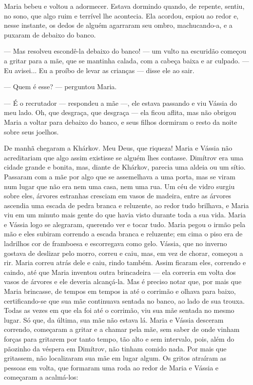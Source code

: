 Maria bebeu e voltou a adormecer. Estava dormindo quando, de repente,
sentiu, no sono, que algo ruim e terrível lhe acontecia. Ela acordou,
espiou ao redor e, nesse instante, os dedos de alguém agarraram seu
ombro, machucando-a, e a puxaram de debaixo do banco.

--- Mas resolveu escondê-la debaixo do banco! --- um vulto na escuridão
começou a gritar para a mãe, que se mantinha calada, com a cabeça baixa
e ar culpado. --- Eu avisei... Eu a proíbo de levar as crianças ---
disse ele ao sair.

--- Quem é esse? --- perguntou Maria.

--- É o recrutador --- respondeu a mãe ---, ele estava passando e viu
Vássia do meu lado. Oh, que desgraça, que desgraça --- ela ficou aflita,
mas não obrigou Maria a voltar para debaixo do banco, e seus filhos
dormiram o resto da noite sobre seus joelhos.

De manhã chegaram a Khárkov. Meu Deus, que riqueza! Maria e Vássia não
acreditariam que algo assim existisse se alguém lhes contasse. Dimítrov
era uma cidade grande e bonita, mas, diante de Khárkov, parecia uma
aldeia ou um sítio. Passaram com a mãe por algo que se assemelhava a uma
porta, mas se viram num lugar que não era nem uma casa, nem uma rua. Um
céu de vidro surgiu sobre eles, árvores estranhas cresciam em vasos de
madeira, entre as árvores ascendia uma escada de pedra branca e
reluzente, ao redor tudo brilhava, e Maria viu em um minuto mais gente
do que havia visto durante toda a sua vida. Maria e Vássia logo se
alegraram, querendo ver e tocar tudo. Maria pegou o irmão pela mão e
eles subiram correndo a escada branca e reluzente; em cima o piso era de
ladrilhos cor de framboesa e escorregava como gelo. Vássia, que no
inverno gostava de deslizar pelo morro, correu e caiu, mas, em vez de
chorar, começou a rir. Maria correu atrás dele e caiu, rindo também.
Assim ficaram eles, correndo e caindo, até que Maria inventou outra
brincadeira --- ela correria em volta dos vasos de árvores e ele deveria
alcançá-la. Mas é preciso notar que, por mais que Maria brincasse, de
tempos em tempos ia até o corrimão e olhava para baixo, certificando-se
que sua mãe continuava sentada no banco, ao lado de sua trouxa. Todas as
vezes em que ela foi até o corrimão, viu sua mãe sentada no mesmo lugar.
Só que, da última, sua mãe não estava lá. Maria e Vássia desceram
correndo, começaram a gritar e a chamar pela mãe, sem saber de onde
vinham forças para gritarem por tanto tempo, tão alto e sem intervalo,
pois, além do pãozinho da véspera em Dimítrov, não tinham comido nada.
Por mais que gritassem, não localizaram sua mãe em lugar algum. Os
gritos atraíram as pessoas em volta, que formaram uma roda ao redor de
Maria e Vássia e começaram a acalmá-los:

